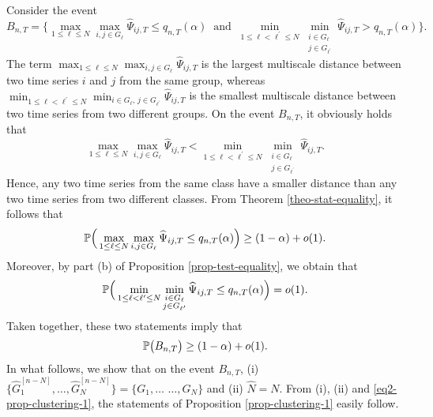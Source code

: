 \documentclass[a4paper,12pt]{article}
\begin{document}
Consider the event  
\[ B_{n,T} = \Big\{ \max_{1 \le \ell \le N} \max_{i,j \in G_\ell} \widehat{\Psi}_{ij,T} \le q_{n,T}(\alpha) \ \text{ and } \ \min_{1 \le \ell < \ell^\prime \le N} \min_{\substack{i \in G_\ell \\ j \in G_{\ell^\prime}}} \widehat{\Psi}_{ij,T} > q_{n,T}(\alpha) \Big\}. \]
The term $\max_{1 \le \ell \le N} \max_{i,j \in G_\ell} \widehat{\Psi}_{ij,T}$ is the largest multiscale distance between two time series $i$ and $j$ from the same group, whereas $\min_{1 \le \ell < \ell^\prime \le N} \min_{i \in G_\ell, \, j \in G_{\ell^\prime}} \widehat{\Psi}_{ij,T}$ is the smallest multiscale distance between two time series from two different groups. On the event $B_{n,T}$, it obviously holds that 
\begin{equation}\label{eq1-prop-clustering-1}
\max_{1 \le \ell \le N} \max_{i,j \in G_\ell} \widehat{\Psi}_{ij,T} < \min_{1 \le \ell < \ell^\prime \le N} \min_{\substack{i \in G_\ell \\ j \in G_{\ell^\prime}}} \widehat{\Psi}_{ij,T}. 
\end{equation}
Hence, any two time series from the same class have a smaller distance than any two time series from two different classes. From Theorem \ref{theo-stat-equality}, it follows that 
\[  \mathbb{P} \Big( \max_{1 \le \ell \le N} \max_{i,j \in G_\ell} \widehat{\Psi}_{ij,T} \le q_{n,T}(\alpha) \Big) \ge (1 - \alpha) + o(1). \]
Moreover, by part (b) of Proposition \ref{prop-test-equality}, we obtain that 
\[  \mathbb{P} \Big( \min_{1 \le \ell < \ell^\prime \le N} \min_{\substack{i \in G_\ell \\ j \in G_{\ell^\prime}}} \widehat{\Psi}_{ij,T} \le q_{n,T}(\alpha) \Big) = o(1). \]
Taken together, these two statements imply that 
\begin{equation}\label{eq2-prop-clustering-1}
\mathbb{P} \big( B_{n,T} \big) \ge (1-\alpha) + o(1). 
\end{equation}
In what follows, we show that on the event $B_{n,T}$, (i) $\{ \widehat{G}_1^{[n-N]},\ldots,\widehat{G}_N^{[n-N]} \big\} = \big\{ G_1,\ldots$ $\ldots,G_N \}$ and (ii) $\widehat{N} = N$. From (i), (ii) and \eqref{eq2-prop-clustering-1}, the statements of Proposition \ref{prop-clustering-1} easily follow. 
\end{document}
